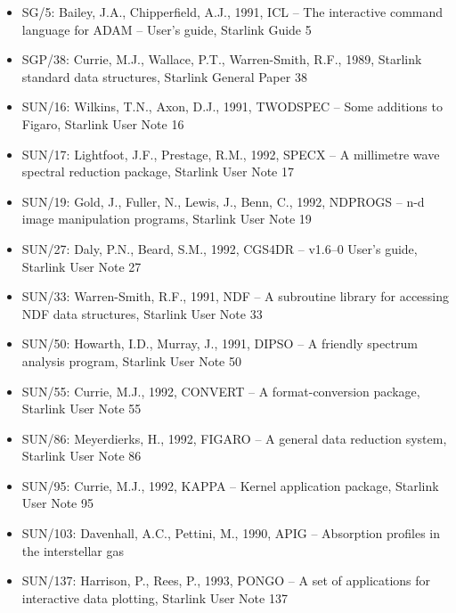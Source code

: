 \begin{itemize}

\item SG/5: Bailey, J.A., Chipperfield, A.J., 1991, ICL -- The
   interactive command language for ADAM -- User's guide, Starlink Guide
   5

\item SGP/38: Currie, M.J., Wallace, P.T., Warren-Smith, R.F., 1989,
   Starlink standard data structures, Starlink General Paper 38

\item SUN/16: Wilkins, T.N., Axon, D.J., 1991, TWODSPEC -- Some
   additions to Figaro, Starlink User Note 16

\item SUN/17: Lightfoot, J.F., Prestage, R.M., 1992, SPECX -- A
   millimetre wave spectral reduction package, Starlink User Note 17

\item SUN/19: Gold, J., Fuller, N., Lewis, J., Benn, C., 1992, NDPROGS
   -- n-d image manipulation programs, Starlink User Note 19

\item SUN/27: Daly, P.N., Beard, S.M., 1992, CGS4DR -- v1.6--0 User's
   guide, Starlink User Note 27

\item SUN/33: Warren-Smith, R.F., 1991, NDF -- A subroutine library for
   accessing NDF data structures, Starlink User Note 33

\item SUN/50: Howarth, I.D., Murray, J., 1991, DIPSO -- A friendly
   spectrum analysis program, Starlink User Note 50

\item SUN/55: Currie, M.J., 1992, CONVERT -- A format-conversion
   package, Starlink User Note 55

\item SUN/86: Meyerdierks, H., 1992, FIGARO -- A general data reduction
   system, Starlink User Note 86

\item SUN/95: Currie, M.J., 1992, KAPPA -- Kernel application package,
   Starlink User Note 95

\item SUN/103: Davenhall, A.C., Pettini, M., 1990, APIG -- Absorption
   profiles in the interstellar gas

\item SUN/137: Harrison, P., Rees, P., 1993, PONGO -- A set of
   applications for interactive data plotting, Starlink User Note 137


\end{itemize}
